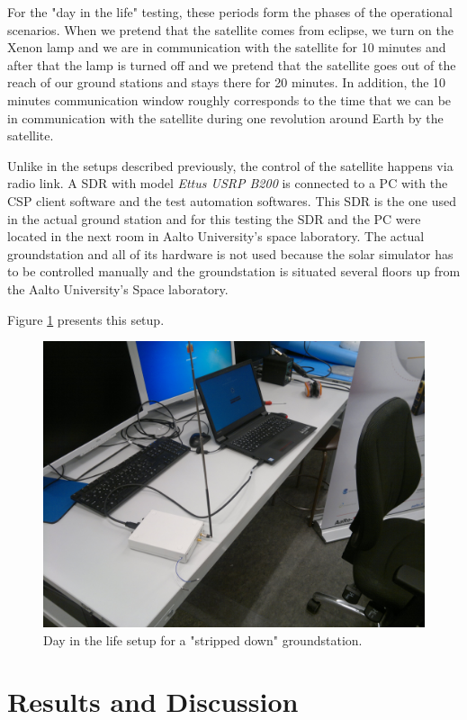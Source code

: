 \documentclass[english,12pt,a4paper,pdftex,elec,utf8]{aaltothesis}
\begin{document}
For the "day in the life" testing, these periods form the phases of the operational scenarios. When we pretend that the satellite comes from eclipse, we turn on the Xenon lamp and we are in communication with the satellite for 10 minutes and after that the lamp is turned off and we pretend that the satellite goes out of the reach of our ground stations and stays there for 20 minutes. In addition, the 10 minutes communication window roughly corresponds to the time that we can be in communication with the satellite during one revolution around Earth by the satellite.\par 
Unlike in the setups described previously, the control of the satellite happens via radio link. A SDR with model \textit{Ettus USRP B200} is connected to a PC with the CSP client software and the test automation softwares. This SDR is the one used in the actual ground station and for this testing the SDR and the PC were located in the next room in Aalto University's space laboratory. The actual groundstation and all of its hardware is not used because the solar simulator has to be controlled manually and the groundstation is situated several floors up from the Aalto University's Space laboratory.\par 
Figure \ref{dayinlifelink} presents this setup.\par
\begin{figure}[h!]
\centering
\includegraphics[scale=0.3]{daysetuplink}
\caption{Day in the life setup for a "stripped down" groundstation.}
\label{dayinlifelink}
\end{figure} 
\clearpage
\section{Results and Discussion}
\end{document}
